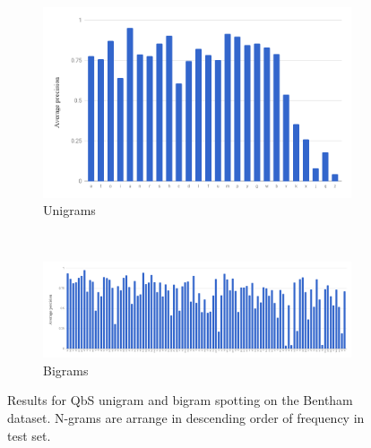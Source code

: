 \documentclass[ms,electronic,twosidetoc,letterpaper,chaptercenter,parttop,lof,lot]{byumsphd}
\begin{document}
\begin{figure}
\centering
\begin{subfigure}{.99\textwidth}
  \centering
  \includegraphics[width=.75\linewidth]{benthamUniSpot}
  \caption{Unigrams}
  \label{fig:benthamUniSpot}
\end{subfigure}
\\
\begin{subfigure}{.99\textwidth}
  \centering
  \includegraphics[width=.99\linewidth]{benthamBiSpot}
  \caption{Bigrams}
  \label{fig:benthamBiSpot}
\end{subfigure}
\caption{Results for QbS unigram and bigram spotting on the Bentham dataset. N-grams are arrange in descending order of frequency in test set.}
\label{fig:benthamsub}
\end{figure}
\end{document}
